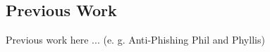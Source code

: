 \subsection{Previous Work}
\label{s:prev_work}
Previous work here ... (e.
g.
 Anti-Phishing Phil and Phyllis)


